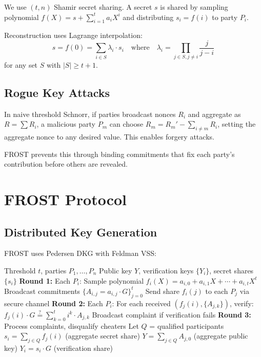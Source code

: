 \documentclass[11pt,a4paper]{article}
\begin{document}
We use $(t,n)$ Shamir secret sharing. A secret $s$ is shared by sampling polynomial $f(X) = s + \sum_{i=1}^{t} a_i X^i$ and distributing $s_i = f(i)$ to party $P_i$.

Reconstruction uses Lagrange interpolation:
\[
s = f(0) = \sum_{i \in S} \lambda_i \cdot s_i \quad \text{where} \quad \lambda_i = \prod_{j \in S, j \neq i} \frac{j}{j-i}
\]
for any set $S$ with $|S| \geq t + 1$.

\subsection{Rogue Key Attacks}

In naive threshold Schnorr, if parties broadcast nonces $R_i$ and aggregate as $R = \sum R_i$, a malicious party $P_m$ can choose $R_m = R_m' - \sum_{i \neq m} R_i$, setting the aggregate nonce to any desired value. This enables forgery attacks.

FROST prevents this through binding commitments that fix each party's contribution before others are revealed.

\section{FROST Protocol}

\subsection{Distributed Key Generation}

FROST uses Pedersen DKG with Feldman VSS:

\begin{algorithm}
\caption{FROST-DKG}
\begin{algorithmic}[1]
\Require Threshold $t$, parties $P_1, \ldots, P_n$
\Ensure Public key $Y$, verification keys $\{Y_i\}$, secret shares $\{s_i\}$
\State \textbf{Round 1:} Each $P_i$:
\State \quad Sample polynomial $f_i(X) = a_{i,0} + a_{i,1}X + \cdots + a_{i,t}X^t$
\State \quad Broadcast commitments $\{A_{i,j} = a_{i,j} \cdot G\}_{j=0}^{t}$
\State \quad Send share $f_i(j)$ to each $P_j$ via secure channel
\State \textbf{Round 2:} Each $P_i$:
\State \quad For each received $(f_j(i), \{A_{j,k}\})$, verify:
\State \quad\quad $f_j(i) \cdot G \stackrel{?}{=} \sum_{k=0}^{t} i^k \cdot A_{j,k}$
\State \quad Broadcast complaint if verification fails
\State \textbf{Round 3:} Process complaints, disqualify cheaters
\State Let $Q$ = qualified participants
\State $s_i = \sum_{j \in Q} f_j(i)$ (aggregate secret share)
\State $Y = \sum_{j \in Q} A_{j,0}$ (aggregate public key)
\State $Y_i = s_i \cdot G$ (verification share)
\end{algorithmic}
\end{algorithm}
\end{document}
